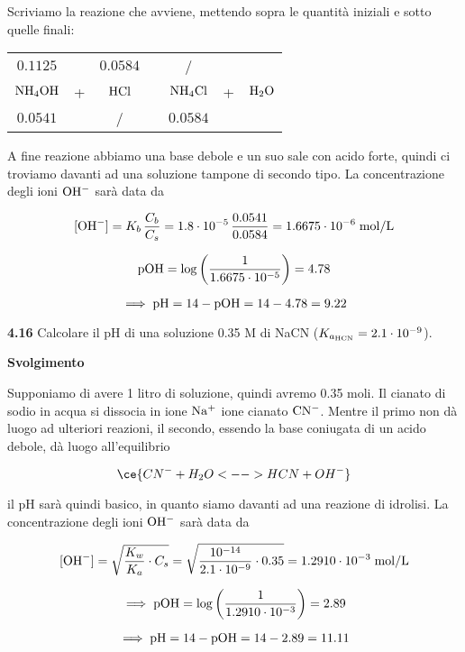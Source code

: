 Scriviamo la reazione che avviene, mettendo sopra le quantità iniziali e sotto quelle finali:

\begin{center}
    \begin{tabular}{ccccccc}
        $0.1125$ &  & $0.0584$ & & / &&\\
        $\rm NH_4OH$ & + & $\rm HCl$ & \ce{->} & $\rm NH_4Cl$ & + & $\rm H_2O$\\
        $0.0541$ &  & / & & $0.0584$ &&\\
    \end{tabular}
\end{center}

A fine reazione abbiamo una base debole e un suo sale con acido forte, quindi ci troviamo davanti ad una soluzione tampone di secondo tipo. La concentrazione degli ioni $\rm OH^-$ sarà data da

$$[\text{OH}^-]=K_b\,\frac{C_b}{C_s}
=1.8 \cdot 10^{-5}\,\frac{0.0541}{0.0584}
=1.6675 \cdot 10^{-6} \; \rm mol/L$$

$$\rm pOH=\log \left( \frac{1}{1.6675 \cdot 10^{-5}} \right)=4.78$$

$$\implies \rm pH=14-pOH=14-4.78=9.22$$

\vspace{0.2cm}\textbf{4.16} Calcolare il pH di una soluzione 0.35 M di NaCN ($K_{a_{\rm HCN}} = 2.1 \cdot 10^{-9}$).

\vspace{0.2cm}\large\textbf{Svolgimento}\normalsize

\vspace{0.2cm}Supponiamo di avere 1 litro di soluzione, quindi avremo 0.35 moli. Il cianato di sodio in acqua si dissocia in ione $\rm Na^+$ ione cianato $\rm CN^-$. Mentre il primo non dà luogo ad ulteriori reazioni, il secondo, essendo la base coniugata di un acido debole, dà luogo all'equilibrio

$$\ce{CN^- + H_2O <--> HCN + OH^-}$$

il pH sarà quindi basico, in quanto siamo davanti ad una reazione di idrolisi. La concentrazione degli ioni $\rm OH^-$ sarà data da


$$[\text{OH}^-]
=\sqrt{\frac{K_w}{K_a}\cdot C_s}
=\sqrt{\frac{10^{-14}}{2.1 \cdot 10^{-9}} \cdot 0.35}
=1.2910 \cdot 10^{-3} \; \rm mol/L$$

$$\implies \rm pOH
=\log{\left(\frac{1}{1.2910 \cdot 10^{-3}}\right)}
=2.89$$

$$\implies \rm pH=14-pOH=14-2.89=11.11$$

